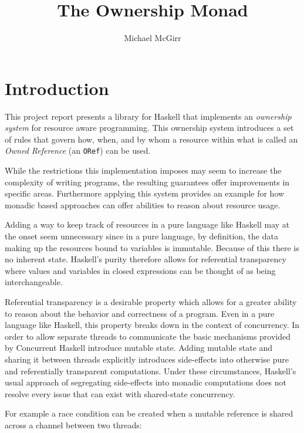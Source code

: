 \documentclass[onehalf,11pt]{beavtex}
\title{The Ownership Monad}
\author{Michael McGirr}
\begin{document}
\maketitle

\mainmatter

\chapter{Introduction}

This project report presents a library for Haskell that implements an
\textit{ownership system} for resource aware programming. This ownership system
introduces a set of rules that govern how, when, and by whom a resource within
what is called an \textit{Owned Reference} (an \texttt{ORef}) can be used.

While the restrictions this implementation imposes may seem to increase the
complexity of writing programs, the resulting guarantees offer improvements in
specific areas.
Furthermore applying this system provides an example for how monadic based
approaches can offer abilities to reason about resource usage.

Adding a way to keep track of resources in a pure language like Haskell may
at the onset seem unnecessary since in a pure language, by definition,
the data making up the resources bound to variables is immutable.
Because of this there is no inherent state.  Haskell's purity therefore allows
for referential transparency where values and variables in closed expressions
can be thought of as being interchangeable.

Referential transparency is a desirable property which allows for a greater
ability to reason about the behavior and correctness of a program.
Even in a pure language like Haskell, this property breaks down in the context
of concurrency.  In order to allow separate threads to communicate the basic
mechanisms provided by Concurrent Haskell introduce mutable state.
Adding mutable state and sharing it between threads explicitly introduces
side-effects into otherwise pure and referentially transparent computations.
Under these circumstances, Haskell's usual approach of segregating side-effects
into monadic computations does not resolve every issue that can exist with
shared-state concurrency.

For example a race condition can be created when a mutable reference is shared
across a channel between two threads:
\end{document}
